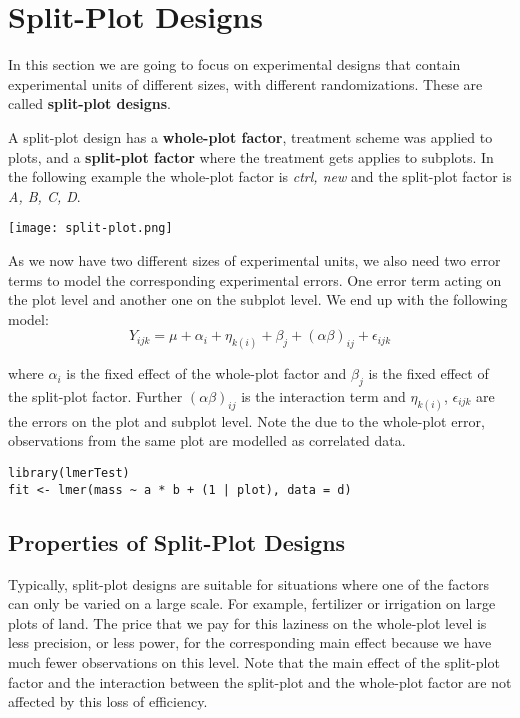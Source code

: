 \section{Split-Plot Designs}

In this section we are going to focus on experimental designs that contain experimental units of different sizes, with different randomizations. These are called \textbf{split-plot designs}. \medskip

A split-plot design has a \textbf{whole-plot factor}, treatment scheme was applied to plots, and a \textbf{split-plot factor} where the treatment gets applies to subplots. In the following example the whole-plot factor is \textit{ctrl, new} and the split-plot factor is \textit{A, B, C, D}.

\begin{center}
	\texttt{[image: split-plot.png]}
\end{center}

As we now have two different sizes of experimental units, we also need two error terms to model the corresponding experimental errors. One error term acting on the plot level and another one on the subplot level. We end up with the following model:
$$Y_{ijk} = \mu + \alpha_i + \eta_{k(i)} + \beta_j + (\alpha \beta)_{ij} + \epsilon_{ijk}$$

where $\alpha_i$ is the fixed effect of the whole-plot factor and $\beta_{j}$ is the fixed effect of the split-plot factor. Further $(\alpha \beta)_{ij}$ is the interaction term and $\eta_{k(i)}$, $\epsilon_{ijk}$ are the errors on the plot and subplot level. Note the due to the whole-plot error, observations from the same plot are modelled as correlated data. 

\begin{lstlisting}
library(lmerTest)
fit <- lmer(mass ~ a * b + (1 | plot), data = d)
\end{lstlisting}


\subsection{Properties of Split-Plot Designs}

Typically, split-plot designs are suitable for situations where one of the factors can only be varied on a large scale. For example, fertilizer or irrigation on large plots of land. The price that we pay for this laziness on the whole-plot level is less precision, or less power, for the corresponding main effect because we have much fewer observations on this level. Note that the main effect of the split-plot factor and the interaction between the split-plot and the whole-plot factor are not affected by this loss of efficiency. \medskip

